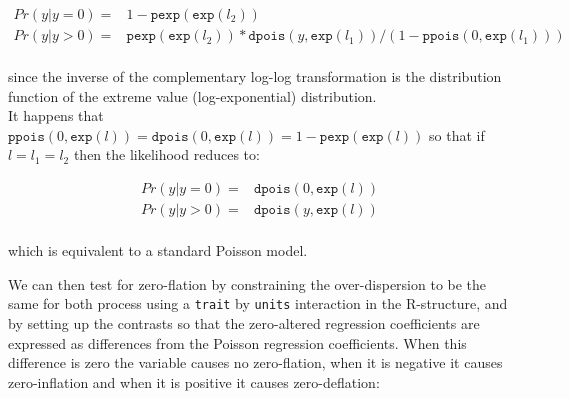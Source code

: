 \documentclass{article}
\begin{document}
\begin{equation} 
\begin{array}{rl}
Pr(y | y=0) =& 1-\texttt{pexp}(\texttt{exp}(l_{2}))\\
Pr(y | y>0) =& \texttt{pexp}(\texttt{exp}(l_{2}))\ast \texttt{dpois}(y, \texttt{exp}(l_{1}))/(1-\texttt{ppois}(0, \texttt{exp}(l_{1})))\\
\end{array}
\end{equation}

since the inverse of the complementary log-log transformation is the distribution function of the extreme value (log-exponential) distribution.\\

It happens that $\texttt{ppois}(0,\texttt{exp}(l)) = \texttt{dpois}(0,\texttt{exp}(l)) = 1-\texttt{pexp}(\texttt{exp}(l))$ so that if $l = l_{1} = l_{2}$ then the likelihood reduces to:

\begin{equation} 
\begin{array}{rl}
Pr(y | y=0) =& \texttt{dpois}(0,\texttt{exp}(l))\\
Pr(y | y>0) =& \texttt{dpois}(y, \texttt{exp}(l))\\
\end{array}
\end{equation}

which is equivalent to a standard Poisson model.

We can then test for zero-flation by constraining the over-dispersion to be the same for both process using a \texttt{trait} by \texttt{units} interaction in the R-structure, and by setting up the contrasts so that the zero-altered regression coefficients are expressed as differences from the Poisson regression coefficients. When this difference is zero the variable causes no zero-flation, when it is negative it causes zero-inflation and when it is positive it causes zero-deflation:
  
\end{document}
